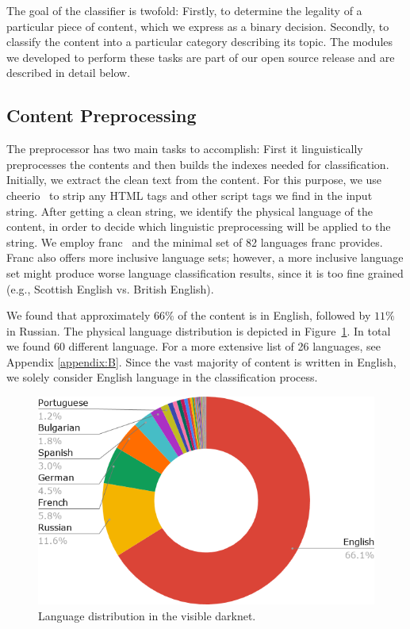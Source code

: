 The goal of the classifier is twofold: Firstly, to determine the legality of a particular piece of content, which we express as a binary decision. Secondly, to classify the content into a particular category describing its topic. The modules we developed to perform these tasks are part of our open source release and are described in detail below.
%
%
\subsection{Content Preprocessing}
The preprocessor has two main tasks to accomplish: First it linguistically preprocesses the contents and then builds the indexes needed for classification. 
Initially, we extract the clean text from the content.
For this purpose, we use cheerio~\cite{cheeriojs} to strip any HTML tags and other script tags we find in the input string.
After getting a clean string, we identify the physical language of the content, in order to decide which linguistic preprocessing will be applied to the string.
We employ franc~\cite{WormerFranc} and the minimal set of 82 languages franc provides. Franc also offers more inclusive language sets; however, a more inclusive language set might produce worse language classification results, since it is too fine grained (e.g., Scottish English vs. British English).

We found that approximately $66\%$ of the content is in English, followed by $11\%$ in Russian. The physical language distribution is depicted in Figure~\ref{fig:languages}. In total we found 60 different language. For a more extensive list of 26 languages, see Appendix \ref{appendix:B}. Since the vast majority of content is written in English, we solely consider English language in the classification process.

\ifdgruyter
  \begin{figure}[H]
  \includegraphics[width=\linewidth]{images/contentsByLanguage.png}
  \caption{Language distribution in the visible darknet.}
  \label{fig:languages}
  \end{figure}
\fi

